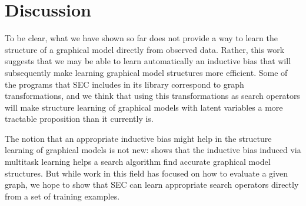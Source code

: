 \documentclass{article} %
\begin{document}
\section{Discussion}

To be clear, what we have shown so far does not provide a way to learn the structure of a graphical model directly from observed data. Rather, this work suggests that we may be able to learn automatically an inductive bias that will subsequently make learning graphical model structures more efficient. Some of the programs that SEC includes in its library correspond to graph transformations, and we think that using this transformations as search operators will make structure learning of graphical models with latent variables a more tractable proposition than it currently is. 

The notion that an appropriate inductive bias might help in the structure learning of graphical models is not new: \citep{DBLP:conf/icml/HonorioS10} shows that the inductive bias induced via multitask learning helps a search algorithm find accurate graphical model structures. But while work in this field has focused on how to evaluate a given graph, we hope to show that SEC can learn appropriate search operators directly from a set of training examples. 




\end{document}
